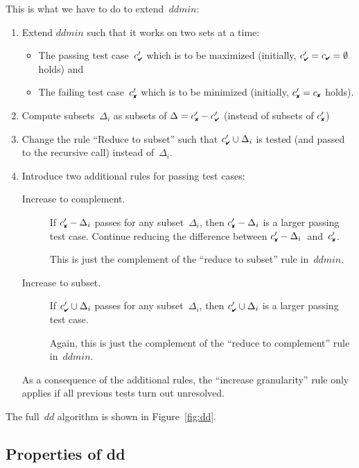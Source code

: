 \documentclass{acm_proc_article-sp}
\newcommand{\PASS}{\text{\ding{52}}\xspace}
\newcommand{\FAIL}{\text{\ding{56}}\xspace}
\newcommand{\cpass}{{c_{\scriptscriptstyle \PASS}}}
\newcommand{\cfail}{{c_{\scriptscriptstyle \FAIL}}}
\newcommand{\dpass}{{c'_{\scriptscriptstyle \PASS}}}
\newcommand{\dfail}{{c'_{\scriptscriptstyle \FAIL}}}
\newcommand{\dd}{\textit{dd}\xspace}
\newcommand{\ddmin}{\textit{ddmin}\xspace}
\theoremstyle{plain}
\begin{document}
This is what we have to do to extend~$\ddmin$:

\begin{enumerate}
\item Extend $\ddmin$ such that it works on two sets at a time:
  \begin{itemize}
  \item The passing test case~$\dpass$ which is to be maximized
    (initially, $\dpass = \cpass = \emptyset$ holds) and
  \item The failing test case~$\dfail$ which is to be minimized
    (initially, $\dfail = \cfail$ holds).
  \end{itemize}
  
\item Compute subsets~$\Delta_i$ as subsets of $\Delta = \dfail - \dpass$
  (instead of subsets of $\dfail$)

\item Change the rule ``Reduce to subset'' such that $\dpass \cup \Delta_i$ is
  tested (and passed to the recursive call) instead of~$\Delta_i$.

\item Introduce two additional rules for passing test cases:
\begin{description}
\item[Increase to complement.]  If $\dfail - \Delta_i$ passes for any
  subset~$\Delta_i$, then $\dfail - \Delta_i$ is a larger passing test case.
  Continue reducing the difference between $\dfail -
  \Delta_i$~and~$\dfail$.
  
  This is just the complement of the ``reduce to subset'' rule
  in~$\ddmin$.
  
\item[Increase to subset.]  If $\dpass \cup \Delta_i$ passes for any
  subset~$\Delta_i$, then $\dpass \cup \Delta_i$ is a larger passing test case.
  
  Again, this is just the complement of the ``reduce to complement''
  rule in~$\ddmin$.
\end{description}
As a consequence of the additional rules, the ``increase granularity''
rule only applies if all previous tests turn out unresolved.
\end{enumerate}

The full~$\dd$ algorithm is shown in Figure~\ref{fig:dd}.


\subsection{Properties of dd}
\end{document}
